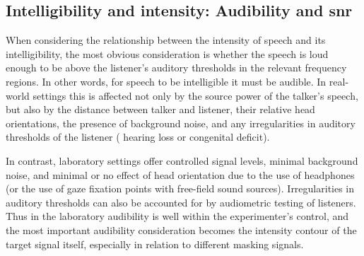 
\subsection[Intelligibility and intensity]{Intelligibility and intensity: Audibility and \ac{snr}\label{sec:IntelIntens}}
When considering the relationship between the intensity of speech and its intelligibility, the most obvious consideration is whether the speech is loud enough to be above the listener’s auditory thresholds in the relevant frequency regions.  In other words, for speech to be intelligible it must be audible.  In real-world settings this is affected not only by the source power of the talker’s speech, but also by the distance between talker and listener, their relative head orientations, the presence of background noise, and any irregularities in auditory thresholds of the listener (\ie{} hearing loss or congenital deficit).

In contrast, laboratory settings offer controlled signal levels, minimal background noise, and minimal or no effect of head orientation due to the use of headphones (or the use of gaze fixation points with free-field sound sources).  Irregularities in auditory thresholds can also be accounted for by audiometric testing of listeners.  Thus in the laboratory audibility is well within the experimenter’s control, and the most important audibility consideration becomes the intensity contour of the target signal itself, especially in relation to different masking signals.%

